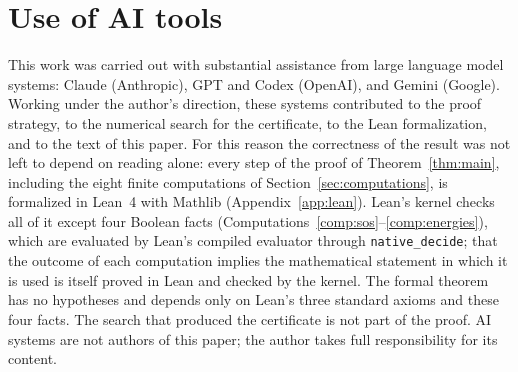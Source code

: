 \documentclass[11pt,reqno]{amsart}
\theoremstyle{definition}
\numberwithin{equation}{section}
\begin{document}
\section*{Use of AI tools}
This work was carried out with substantial assistance from large language model systems: Claude (Anthropic), GPT and Codex (OpenAI), and Gemini (Google). Working under the author's direction, these systems contributed to the proof strategy, to the numerical search for the certificate, to the Lean formalization, and to the text of this paper. For this reason the correctness of the result was not left to depend on reading alone: every step of the proof of Theorem~\ref{thm:main}, including the eight finite computations of Section~\ref{sec:computations}, is formalized in Lean~4 with Mathlib (Appendix~\ref{app:lean}). Lean's kernel checks all of it except four Boolean facts (Computations~\ref{comp:sos}--\ref{comp:energies}), which are evaluated by Lean's compiled evaluator through \texttt{native\_decide}; that the outcome of each computation implies the mathematical statement in which it is used is itself proved in Lean and checked by the kernel. The formal theorem has no hypotheses and depends only on Lean's three standard axioms and these four facts. The search that produced the certificate is not part of the proof. AI systems are not authors of this paper; the author takes full responsibility for its content.
\end{document}
